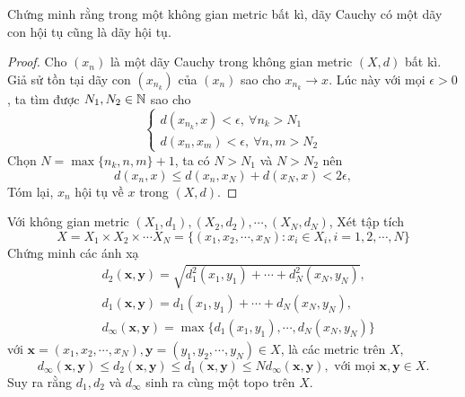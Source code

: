 \begin{exercise}{8}
    Chứng minh rằng trong một không gian metric bất kì, dãy Cauchy có một dãy con hội tụ cũng là dãy hội tụ.
\end{exercise}

\begin{proof}
    Cho $(x_n)$ là một dãy Cauchy trong không gian metric $(X,d)$ bất kì. Giả sử tồn tại dãy con $(x_{n_k})$ của $(x_n)$ sao cho $x_{n_k} \rightarrow x$. Lúc này với mọi $\epsilon > 0$, ta tìm được $N_1, N_2 \in \mathbb N$ sao cho
    $$\begin{cases}
        d(x_{n_k},x) < \epsilon,\ \forall n_k > N_1\\
        d(x_n, x_m) < \epsilon,\ \forall n,m > N_2
    \end{cases}$$
    Chọn $N = \max\{n_k, n, m\} + 1$, ta có $N > N_1$ và $N > N_2$ nên
    $$
        d(x_n,x) \leq d(x_n, x_N) + d(x_N,x) < 2 \epsilon,
    $$
    Tóm lại, $x_n$ hội tụ về $x$ trong $(X,d)$.
\end{proof}

\begin{exercise}{9}
    Với không gian metric $(X_1,d_1), (X_2,d_2), \cdots, (X_N,d_N)$, Xét tập tích
    $$
        X = X_1 \times X_2 \times \cdots X_N = \{(x_1,x_2,\cdots,x_N): x_i \in X_i, i = 1,2,\cdots,N\}
    $$
    Chứng minh các ánh xạ
    \begin{align*}
        &d_2(\mathbf{x}, \mathbf{y}) = \sqrt{d_1^2(x_1,y_1) + \cdots + d_N^2(x_N,y_N)},\\
        &d_1(\mathbf{x}, \mathbf{y}) = d_1(x_1,y_1) + \cdots + d_N(x_N,y_N),\\
        &d_{\infty}(\mathbf{x}, \mathbf{y}) = \max\{d_1(x_1,y_1), \cdots, d_N(x_N,y_N)\}
    \end{align*}
    với $\mathbf{x} = (x_1,x_2,\cdots,x_N), \mathbf{y} = (y_1,y_2,\cdots,y_N) \in X$, là các metric trên $X$,
    $$
        d_{\infty}(\mathbf{x}, \mathbf{y}) \leq d_{2}(\mathbf{x}, \mathbf{y}) \leq d_{1}(\mathbf{x}, \mathbf{y}) \leq N d_{\infty}(\mathbf{x}, \mathbf{y}), \text{ với mọi } \mathbf{x}, \mathbf{y} \in X.
    $$
    Suy ra rằng $d_1,d_2$ và $d_{\infty}$ sinh ra cùng một topo trên $X$.
\end{exercise}

